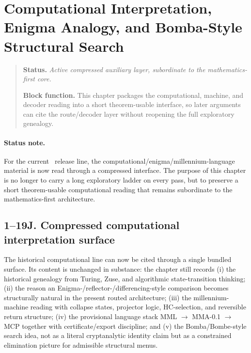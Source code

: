 \section{Computational Interpretation, Enigma Analogy, and Bomba-Style Structural Search}
\begin{quote}\small
\noindent\textbf{Status.} \emph{Active compressed auxiliary layer, subordinate to the mathematics-first core.}\par
\noindent\textbf{Block function.} This chapter packages the computational, machine, and decoder reading into a short theorem-usable interface, so later arguments can cite the route/decoder layer without reopening the full exploratory genealogy.
\end{quote}
\label{sec:computational-reading}

\paragraph{Status note.}
For the current \docversion\ release line, the computational/enigma/millennium-language material is now read through a compressed interface. The purpose of this chapter is no longer to carry a long exploratory ladder on every pass, but to preserve a short theorem-usable computational reading that remains subordinate to the mathematics-first architecture.

\subsection*{1--19J. Compressed computational interpretation surface}
The historical computational line can now be cited through a single bundled surface. Its content is unchanged in substance: the chapter still records (i) the historical genealogy from Turing, Zuse, and algorithmic state-transition thinking; (ii) the reason an Enigma-/reflector-/differencing-style comparison becomes structurally natural in the present routed architecture; (iii) the millennium-machine reading with collapse states, projector logic, HC-selection, and reversible return structure; (iv) the provisional language stack MML $\to$ MMA-0.1 $\to$ MCP together with certificate/export discipline; and (v) the Bomba/Bombe-style search idea, not as a literal cryptanalytic identity claim but as a constrained elimination picture for admissible structural menus.

